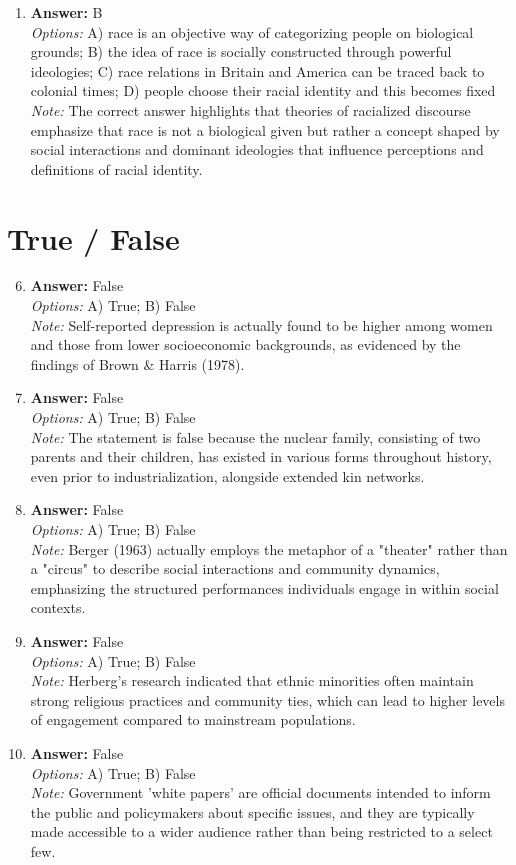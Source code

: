 \documentclass[12pt]{article}
\begin{document}
\begin{enumerate}[label=\arabic*.]
\item \textbf{Answer:} B
\\ \textit{Options:} A) race is an objective way of categorizing people on biological grounds; B) the idea of race is socially constructed through powerful ideologies; C) race relations in Britain and America can be traced back to colonial times; D) people choose their racial identity and this becomes fixed
\\ \textit{Note:} The correct answer highlights that theories of racialized discourse emphasize that race is not a biological given but rather a concept shaped by social interactions and dominant ideologies that influence perceptions and definitions of racial identity.
\end{enumerate}

\section*{True / False}
\begin{enumerate}[label=\arabic*.]
\setcounter{enumi}{5}
\item \textbf{Answer:} False
\\ \textit{Options:} A) True; B) False
\\ \textit{Note:} Self-reported depression is actually found to be higher among women and those from lower socioeconomic backgrounds, as evidenced by the findings of Brown \& Harris (1978).
\item \textbf{Answer:} False
\\ \textit{Options:} A) True; B) False
\\ \textit{Note:} The statement is false because the nuclear family, consisting of two parents and their children, has existed in various forms throughout history, even prior to industrialization, alongside extended kin networks.
\item \textbf{Answer:} False
\\ \textit{Options:} A) True; B) False
\\ \textit{Note:} Berger (1963) actually employs the metaphor of a "theater" rather than a "circus" to describe social interactions and community dynamics, emphasizing the structured performances individuals engage in within social contexts.
\item \textbf{Answer:} False
\\ \textit{Options:} A) True; B) False
\\ \textit{Note:} Herberg's research indicated that ethnic minorities often maintain strong religious practices and community ties, which can lead to higher levels of engagement compared to mainstream populations.
\item \textbf{Answer:} False
\\ \textit{Options:} A) True; B) False
\\ \textit{Note:} Government 'white papers' are official documents intended to inform the public and policymakers about specific issues, and they are typically made accessible to a wider audience rather than being restricted to a select few.
\end{enumerate}
\end{document}
